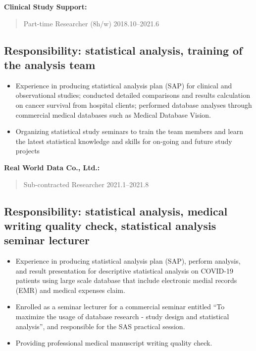 \documentclass[10pt,]{article}
\providecommand{\tightlist}{%
  \setlength{\itemsep}{0pt}\setlength{\parskip}{0pt}}
\begin{document}
\textbf{Clinical Study Support:}

\begin{quote}
Part-time Researcher (8h/w) \hfill 2018.10--2021.6
\end{quote}

\hypertarget{responsibility-statistical-analysis-training-of-the-analysis-team}{%
\subsection{Responsibility: statistical analysis, training of the
analysis
team}\label{responsibility-statistical-analysis-training-of-the-analysis-team}}

\begin{itemize}
\tightlist
\item
  Experience in producing statistical analysis plan (SAP) for clinical
  and observational studies; conducted detailed comparisons and results
  calculation on cancer survival from hospital clients; performed
  database analyses through commercial medical databases such as Medical
  Database Vision.
\item
  Organizing statistical study seminars to train the team members and
  learn the latest statistical knowledge and skills for on-going and
  future study projects
\end{itemize}

\textbf{Real World Data Co., Ltd.:}

\begin{quote}
Sub-contracted Researcher \hfill 2021.1--2021.8
\end{quote}

\hypertarget{responsibility-statistical-analysis-medical-writing-quality-check-statistical-analysis-seminar-lecturer}{%
\subsection{Responsibility: statistical analysis, medical writing
quality check, statistical analysis seminar
lecturer}\label{responsibility-statistical-analysis-medical-writing-quality-check-statistical-analysis-seminar-lecturer}}

\begin{itemize}
\tightlist
\item
  Experience in producing statistical analysis plan (SAP), perform
  analysis, and result presentation for descriptive statistical analysis
  on COVID-19 patients using large scale database that include
  electronic medial records (EMR) and medical expenses claim.
\item
  Enrolled as a seminar lecturer for a commercial seminar entitled ``To
  maximize the usage of database research - study design and statistical
  analysis'', and responsible for the SAS practical session.
\item
  Providing professional medical manuscript writing quality check.
\end{itemize}
\end{document}
